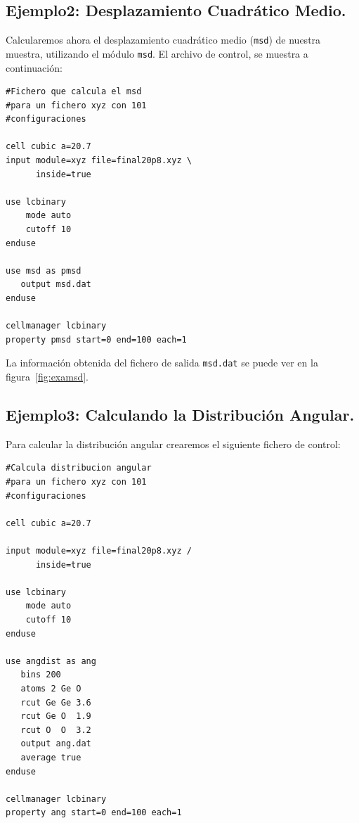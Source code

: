 
\subsection{Ejemplo2: Desplazamiento Cuadr\'atico Medio.}

Calcularemos ahora el desplazamiento cuadr\'atico medio (\verb|msd|) de nuestra muestra, utilizando el m\'odulo \verb|msd|. El archivo de control, se muestra a continuaci\'on:

\begin{multicols}{2}
\setlength{\columnseprule}{.5pt}
\begin{verbatim}
#Fichero que calcula el msd
#para un fichero xyz con 101 
#configuraciones

cell cubic a=20.7
input module=xyz file=final20p8.xyz \
      inside=true

use lcbinary
    mode auto
    cutoff 10
enduse

use msd as pmsd
   output msd.dat
enduse

cellmanager lcbinary
property pmsd start=0 end=100 each=1
\end{verbatim}
\end{multicols}


La informaci\'on obtenida del fichero de salida \verb|msd.dat| se puede ver en la figura~\ref{fig:examsd}.

\subsection{Ejemplo3: Calculando la Distribuci\'on Angular.}

Para calcular la distribuci\'on angular crearemos el siguiente fichero de control:

\begin{multicols}{2}
\setlength{\columnseprule}{.5pt}
\begin{verbatim}
#Calcula distribucion angular
#para un fichero xyz con 101 
#configuraciones

cell cubic a=20.7

input module=xyz file=final20p8.xyz /
      inside=true

use lcbinary
    mode auto
    cutoff 10
enduse

use angdist as ang
   bins 200
   atoms 2 Ge O
   rcut Ge Ge 3.6
   rcut Ge O  1.9
   rcut O  O  3.2
   output ang.dat
   average true
enduse

cellmanager lcbinary
property ang start=0 end=100 each=1
\end{verbatim}
\end{multicols}

